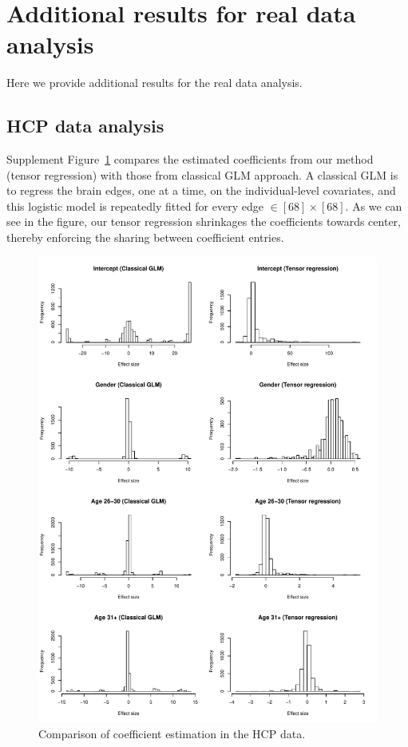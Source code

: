 \documentclass[11pt]{article}
\theoremstyle{plain}
\theoremstyle{definition}
\begin{document}
\section{Additional results for real data analysis}
Here we provide additional results for the real data analysis. 


\subsection{HCP data analysis}


Supplement Figure~\ref{fig:s1} compares the estimated coefficients from our method (tensor regression) with those from classical GLM approach. A classical GLM is to regress the brain edges, one at a time, on the individual-level covariates, and this logistic model is repeatedly fitted for every edge $\in [68]\times [68]$. As we can see in the figure, our tensor regression shrinkages the coefficients towards center, thereby enforcing the sharing between coefficient entries. 

\begin{figure}[ht]
\includegraphics[width=17cm]{compare.pdf}
\caption{Comparison of coefficient estimation in the HCP data.}\label{fig:s1}
\end{figure}
\end{document}
